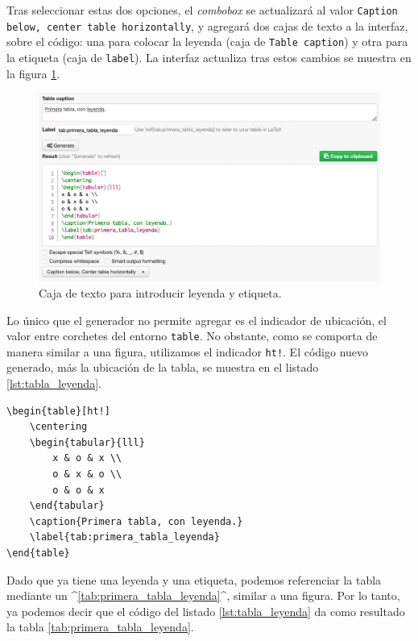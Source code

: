 Tras seleccionar estas dos opciones, el \emph{combobox} se actualizará al valor \texttt{Caption below, center table horizontally}, y agregará dos cajas de texto a la interfaz, sobre el código: una para colocar la leyenda (caja de \texttt{Table caption}) y otra para la etiqueta (caja de \texttt{label}). La interfaz actualiza tras estos cambios se muestra en la figura \ref{fig:table_editor_caption}.

\begin{figure}[ht!]
	\centering
	\includegraphics[width=\linewidth]{img/table_editor_caption_300ppi.png}
	\caption{Caja de texto para introducir leyenda y etiqueta.}
	\label{fig:table_editor_caption}
\end{figure}

Lo único que el generador no permite agregar es el indicador de ubicación, el valor entre corchetes del entorno \texttt{table}. No obstante, como se comporta de manera similar a una figura, utilizamos el indicador \texttt{ht!}. El código nuevo generado, más la ubicación de la tabla, se muestra en el listado \ref{lst:tabla_leyenda}.

\begin{lstlisting}[style=latex,caption={Código para tabla con leyenda.},label=lst:tabla_leyenda]
\begin{table}[ht!]
	\centering
	\begin{tabular}{lll}
		x & o & x \\
		o & x & o \\
		o & o & x
	\end{tabular}
	\caption{Primera tabla, con leyenda.}
	\label{tab:primera_tabla_leyenda}
\end{table}
\end{lstlisting}

Dado que ya tiene una leyenda y una etiqueta, podemos referenciar la tabla mediante un ^\ref{tab:primera_tabla_leyenda}^, similar a una figura. Por lo tanto, ya podemos decir que el código del listado \ref{lst:tabla_leyenda} da como resultado la tabla \ref{tab:primera_tabla_leyenda}.

